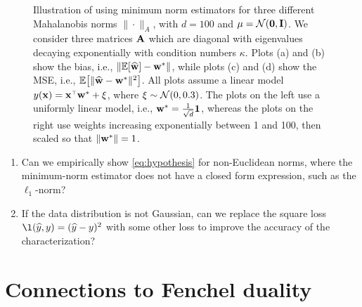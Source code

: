 \documentclass[11pt]{article}
\begin{document}
\begin{figure}[H]
\begin{subfigure}[t]{0.48\textwidth}
  \caption{}
\end{subfigure}
\caption{Illustration of using minimum norm estimators for three
  different Mahalanobis norms $\|\cdot\|_A$, with $d=100$ and
  $\mu=\mathcal{N}(\mathbf 0,\mathbf I)$. We consider three matrices $\mathbf A$ which are diagonal with
eigenvalues decaying exponentially with condition numbers
$\kappa$. Plots (a) and (b) show the bias, i.e., $\|\mathbb E[\widehat{\mathbf w}]-\mathbf w^*\|$,
while plots (c) and (d) show the MSE, i.e.,
$\mathbb E\big[\|\widehat{\mathbf w}-\mathbf w^*\|^2\big]$. All plots assume a linear model
$y(\x)=\x^\top\w^*+\xi$, where $\xi\sim \mathcal{N}(0,0.3)$. The plots on the
left use a  uniformly linear model, i.e., $\mathbf w^*=\frac1{\sqrt{d}}\mathbf 1$,
whereas the plots on the right use weights increasing exponentially
between  1 and 100, then scaled so that $\|\mathbf w^*\|=1$.}
\label{f:intro}
\end{figure}


\begin{enumerate}
  \item Can we empirically show \eqref{eq:hypothesis} for
    non-Euclidean norms, where the minimum-norm estimator does not
    have a closed form expression, such as the $\ell_1$-norm?
  \item If the data distribution is not Gaussian, can we replace the
    square loss  $\l(\yh,y)=(\yh-y)^2$ with some other loss to improve
    the accuracy of the characterization?
\end{enumerate}

\section*{Connections to Fenchel duality}
\end{document}
